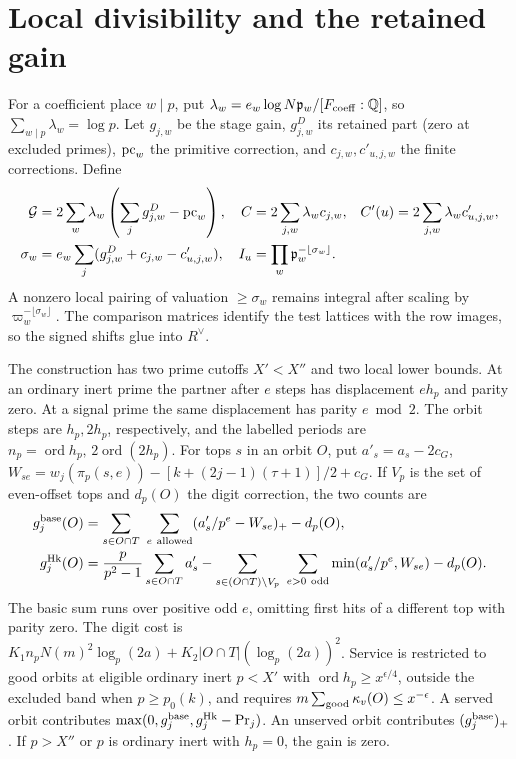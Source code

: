 \documentclass[letterpaper,11pt]{article}
\newcommand{\QQ}{\mathbb Q}
\newcommand{\ord}{\operatorname{ord}}
\newcommand{\Gain}{\mathcal G}
\begin{document}
\section{Local divisibility and the retained gain}\label{sec:div}
For a coefficient place \(w\mid p\), put \(\lambda_w=e_w\log N\mathfrak p_w/[F_{\rm coeff}:\QQ]\), so \(\sum_{w\mid p}\lambda_w=\log p\). Let \(g_{j,w}\) be the stage gain, \(g^D_{j,w}\) its retained part (zero at excluded primes), \({\rm pc}_w\) the primitive correction, and \(c_{j,w},c'_{u,j,w}\) the finite corrections. Define
\begin{align*}
 \Gain&=2\sum_w\lambda_w\left(\sum_j g^D_{j,w}-{\rm pc}_w\right),&
 C&=2\sum_{j,w}\lambda_wc_{j,w},&
 C'(u)&=2\sum_{j,w}\lambda_wc'_{u,j,w},\\
 \sigma_w&=e_w\sum_j(g^D_{j,w}+c_{j,w}-c'_{u,j,w}),&
 I_u&=\prod_w\mathfrak p_w^{-\lfloor\sigma_w\rfloor}.
\end{align*}
A nonzero local pairing of valuation \(\ge\sigma_w\) remains integral after scaling by \(\varpi_w^{-\lfloor\sigma_w\rfloor}\). The comparison matrices identify the test lattices with the row images, so the signed shifts glue into \(R^\vee\).

The construction has two prime cutoffs \(X'<X''\) and two local lower bounds. At an ordinary inert prime the partner after \(e\) steps has displacement \(eh_p\) and parity zero. At a signal prime the same displacement has parity \(e\bmod2\). The orbit steps are \(h_p,2h_p\), respectively, and the labelled periods are \(n_p=\ord h_p,\,2\ord(2h_p)\). For tops \(s\) in an orbit \(O\), put \(a'_s=a_s-2c_G\), \(W_{se}=w_j(\pi_p(s,e))-[k+(2j-1)(\tau+1)]/2+c_G\). If \(V_p\) is the set of even-offset tops and \(d_p(O)\) the digit correction, the two counts are
\begin{align*}
 g_j^{\rm base}(O)&=\sum_{s\in O\cap T}\ \sum_{e\ {\rm allowed}}(a'_s/p^e-W_{se})_+-d_p(O),\\
 g_j^{\rm Hk}(O)&=\frac{p}{p^2-1}\sum_{s\in O\cap T}a'_s
 -\sum_{s\in(O\cap T)\setminus V_p}\ \sum_{e>0\ {\rm odd}}\min(a'_s/p^e,W_{se})-d_p(O).
\end{align*}
The basic sum runs over positive odd \(e\), omitting first hits of a different top with parity zero. The digit cost is \(K_1n_pN(m)^2\log_p(2a)+K_2|O\cap T|(\log_p(2a))^2\). Service is restricted to good orbits at eligible ordinary inert \(p<X'\) with \(\ord h_p\ge x^{\epsilon/4}\), outside the excluded band when \(p\ge p_0(k)\), and requires \(m\sum_{\rm good}\kappa_v(O)\le x^{-\epsilon}\). A served orbit contributes \(\max(0,g_j^{\rm base},g_j^{\rm Hk}-{\rm Pr}_j)\). An unserved orbit contributes \((g_j^{\rm base})_+\). If \(p>X''\) or \(p\) is ordinary inert with \(h_p=0\), the gain is zero.
\end{document}
